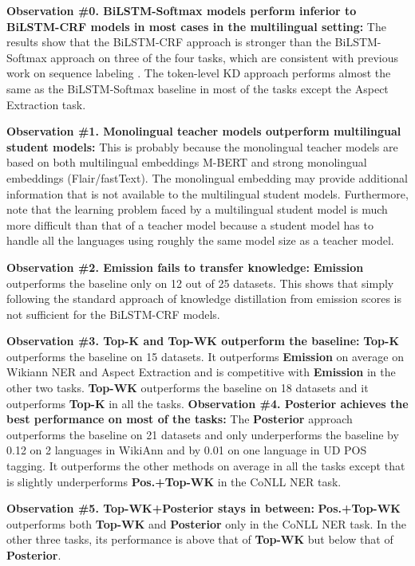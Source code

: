 \documentclass[11pt,a4paper]{article}
\begin{document}
\noindent\textbf{Observation \#0. BiLSTM-Softmax models perform inferior to BiLSTM-CRF models in most cases in the multilingual setting:}
The results show that the BiLSTM-CRF approach is stronger than the BiLSTM-Softmax approach on three of the four tasks, which are consistent with previous work on sequence labeling \cite{ma-hovy-2016-end,reimers2017optimal,yang-etal-2018-design}. The token-level KD approach performs almost the same as the BiLSTM-Softmax baseline in most of the tasks except the Aspect Extraction task.

\noindent\textbf{Observation \#1. Monolingual teacher models outperform multilingual student models:}
This is probably because the monolingual teacher models are based on both multilingual embeddings M-BERT and strong monolingual embeddings (Flair/fastText). The monolingual embedding may provide additional information that is not available to the multilingual student models.
Furthermore, note that the learning problem faced by a multilingual student model is much more difficult than that of a teacher model because a student model has to handle all the languages using roughly the same model size as a teacher model.


\noindent\textbf{Observation \#2. Emission fails to transfer knowledge:}
\textbf{Emission} outperforms the baseline only on 12 out of 25 datasets. This shows that simply following the standard approach of knowledge distillation from emission scores is not sufficient for the BiLSTM-CRF models.

\noindent\textbf{Observation \#3. Top-K and Top-WK outperform the baseline:}
\textbf{Top-K} outperforms the baseline on 15 datasets. It outperforms \textbf{Emission} on average on Wikiann NER and Aspect Extraction and is competitive with \textbf{Emission} in the other two tasks. \textbf{Top-WK} outperforms the baseline on 18 datasets and it outperforms \textbf{Top-K} in all the tasks.
\noindent\textbf{Observation \#4. Posterior achieves the best performance on most of the tasks:}
The \textbf{Posterior} approach outperforms the baseline on 21 datasets and only underperforms the baseline by 0.12 on 2 languages in WikiAnn and by 0.01 on one language in UD POS tagging. It outperforms the other methods on average in all the tasks except that is slightly underperforms \textbf{Pos.+Top-WK} in the CoNLL NER task.

\noindent\textbf{Observation \#5. Top-WK+Posterior stays in between:}
\textbf{Pos.+Top-WK} outperforms both \textbf{Top-WK} and \textbf{Posterior} only in the CoNLL NER task. In the other three tasks, its performance is above that of \textbf{Top-WK} but below that of \textbf{Posterior}.
\end{document}
